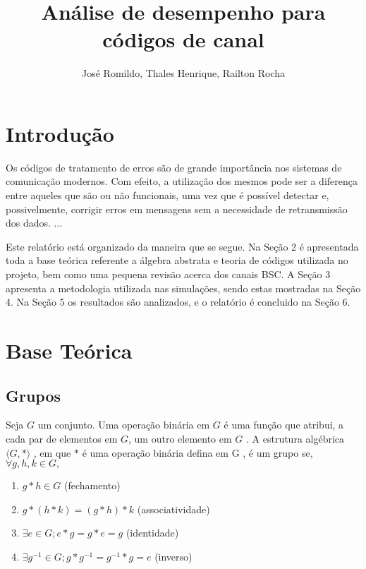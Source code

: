 \documentclass[]{article}
\title{ An{\'a}lise de desempenho para c{\'o}digos de canal}
\author{Jos{\'e} Romildo, Thales Henrique, Railton Rocha}
\begin{document}
\maketitle

\section{Introdução}

\par
Os códigos de tratamento de erros são de grande importância nos sistemas de comunicação modernos. Com efeito, a utilização dos mesmos pode ser a diferença entre aqueles que são ou não funcionais, uma vez que é possível detectar e, possivelmente, corrigir erros em mensagens sem a necessidade de retransmissão dos dados. 
... %

\par
Este relatório está organizado da maneira que se segue. Na Seção 2 é apresentada toda a base teórica referente a álgebra abstrata e teoria de códigos utilizada no projeto, bem como uma pequena revisão acerca dos canais BSC. A Seção 3 apresenta a metodologia utilizada nas simulações, sendo estas mostradas na Seção 4. Na Seção 5 os resultados são analizados, e o relatório é concluido na Seção 6.

\section{Base Teórica}
\subsection{Grupos}

\par
Seja $G$ um conjunto. Uma operação binária em $G$ é uma função que atribui, a cada par de elementos em $G$, um outro elemento em $G$ . A estrutura algébrica  $\langle G , * \rangle$ , em que $*$ é uma operação binária defina em G , é um grupo se, $\forall g , h , k \in G,$

\begin{enumerate}[G1.]
	\item $g * h \in G$ (fechamento)
	\item $ g * (h * k) = (g*h)*k$ (associatividade)
	\item $ \exists e \in G ; e * g = g * e = g $ (identidade)
	\item $ \exists g^{-1} \in G;  g*g^{-1} = g^{-1} *g=e $ (inverso)
\end{enumerate}
\end{document}
